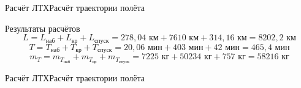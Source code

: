 \begin{frame}{Расчёт ЛТХ}{Расчёт траектории полёта}
    \begin{block}{Результаты расчётов}
    $$L = L_\text{наб} + L_\text{кр} + L_\text{спуск} = 278,04 \text{ км} + 7610 \text{ км} + 314,16 \text{ км} = 8202,2 \text{ км}$$ 
        $$T = T_\text{наб} + T_\text{кр} + T_\text{спуск} = 20,06 \text{ мин} + 403 \text{ мин} + 42 \text{ мин} = 465,4 \text{ мин}$$ 
        $$m_T = m_{T_\text{наб}} + m_{T_\text{кр}} + m_{T_\text{спуск}} = 7225 \text{ кг} + 50 234 \text{ кг} + 757 \text{ кг}= 58216 \text{ кг}$$
    \end{block}
\end{frame}

\begin{frame}{Расчёт ЛТХ}{Расчёт траектории полёта}
\end{frame}


